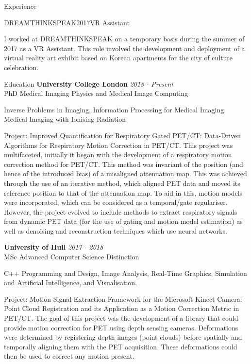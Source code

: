 \documentclass{cv}
\begin{document}
\begin{rSection}{Experience}
        \begin{rSubsection}{DREAMTHINKSPEAK}{2017}{VR Assistant}{}
            \item I worked at DREAMTHINKSPEAK on a temporary basis during the summer of 2017 as a VR Assistant. This role involved the development and deployment of a virtual reality art exhibit based on Korean apartments for the city of culture celebration.
        \end{rSubsection}
    \end{rSection}
    
    \begin{rSection}{Education}
        {\bf University College London} \hfill {\em 2018 - Present} 
        \\ PhD Medical Imaging Physics and Medical Image Computing
        
        \item Inverse Problems in Imaging, Information Processing for Medical Imaging, Medical Imaging with Ionising Radiation
        
        \item Project: Improved Quantification for Respiratory Gated PET/CT: Data-Driven Algorithms for Respiratory Motion Correction in PET/CT. This project was multifaceted, initially it began with the development of a respiratory motion correction method for PET/CT. This method was invariant of the position (and hence of the introduced bias) of a misaligned attenuation map. This was achieved through the use of an iterative method, which aligned PET data and moved its reference position to that of the attenuation map. To aid in this, motion models were incorporated, which can be considered as a temporal/gate regulariser. However, the project evolved to include methods to extract respiratory signals from dynamic PET data (for the use of gating and motion model estimation) as well as denoising and reconstruction techniques which use neural networks.
        
        {\bf University of Hull} \hfill {\em 2017 - 2018} 
        \\ MSc Advanced Computer Science \hfill {Distinction}
        
        \item C++ Programming and Design, Image Analysis, Real-Time Graphics, Simulation and Artificial Intelligence, and Visualisation.
        
        \item Project: Motion Signal Extraction Framework for the Microsoft Kinect Camera: Point Cloud Registration and its Application as a Motion Correction Metric in PET/CT. The goal of this project was the development of a library that could provide motion correction for PET using depth sensing cameras. Deformations were determined by registering depth images (point clouds) before spatially and temporally aligning them with the PET acquisition. These deformations could then be used to correct any motion present.
        

\end{rSection}
\end{document}
